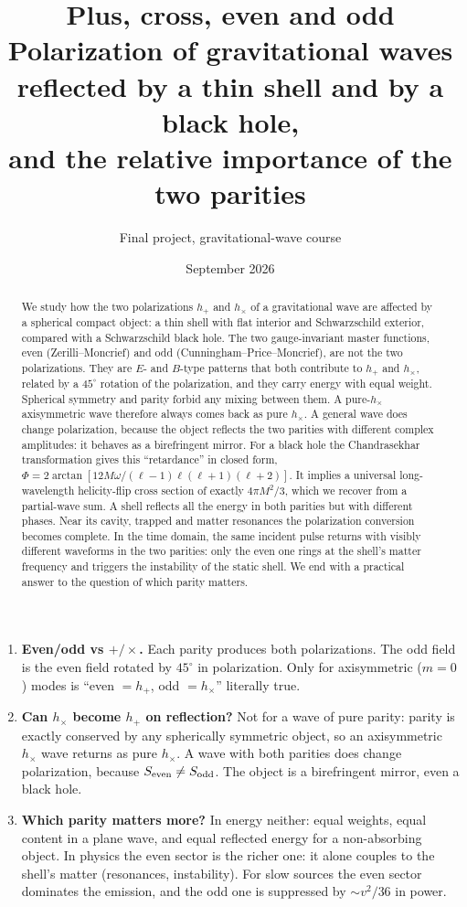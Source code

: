\documentclass[11pt,a4paper]{article}
\title{\textbf{Plus, cross, even and odd}\\[4pt]
\large Polarization of gravitational waves reflected by a thin shell and by a black hole,\\
and the relative importance of the two parities}
\author{Final project, gravitational-wave course}
\date{September 2026}
\numberwithin{equation}{section}
\begin{document}
\maketitle

\begin{abstract}
We study how the two polarizations $h_+$ and $h_\times$ of a gravitational wave are affected by a spherical compact object:
a thin shell with flat interior and Schwarzschild exterior, compared with a Schwarzschild black hole. The two gauge-invariant
master functions, even (Zerilli--Moncrief) and odd (Cunningham--Price--Moncrief), are not the two polarizations. They
are $E$- and $B$-type patterns that both contribute to $h_+$ and $h_\times$, related by a $45^\circ$ rotation of the polarization,
and they carry energy with equal weight. Spherical symmetry and parity forbid any mixing between them. A pure-$h_\times$
axisymmetric wave therefore always comes back as pure $h_\times$. A general wave does change polarization, because the
object reflects the two parities with different complex amplitudes: it behaves as a birefringent mirror. For a black
hole the Chandrasekhar transformation gives this ``retardance'' in closed form, $\Phi=2\arctan[12M\omega/(\ell-1)\ell(\ell+1)(\ell+2)]$.
It implies a universal long-wavelength helicity-flip cross section of exactly $4\pi M^2/3$, which we recover from a
partial-wave sum. A shell reflects all the energy in both parities but with different phases. Near its cavity, trapped
and matter resonances the polarization conversion becomes complete. In the time domain, the same incident pulse
returns with visibly different waveforms in the two parities: only the even one rings at the shell's matter frequency
and triggers the instability of the static shell. We end with a practical answer to the question of which parity matters.
\end{abstract}

\begin{answers}
\begin{enumerate}[leftmargin=1.4em]
\item \textbf{Even/odd vs $+/\times$.} Each parity produces both polarizations. The odd field is the even field rotated by
$45^\circ$ in polarization. Only for axisymmetric ($m=0$) modes is ``even $=h_+$, odd $=h_\times$'' literally true.
\item \textbf{Can $h_\times$ become $h_+$ on reflection?} Not for a wave of pure parity: parity is exactly conserved by any
spherically symmetric object, so an axisymmetric $h_\times$ wave returns as pure $h_\times$. A wave with both parities does
change polarization, because $S_{\rm even}\ne S_{\rm odd}$. The object is a birefringent mirror, even a black hole.
\item \textbf{Which parity matters more?} In energy neither: equal weights, equal content in a plane wave, and equal
reflected energy for a non-absorbing object. In physics the even sector is the richer one: it alone couples to the
shell's matter (resonances, instability). For slow sources the even sector dominates the emission, and the odd one is
suppressed by $\sim v^2/36$ in power.
\end{enumerate}
\end{answers}
\end{document}
